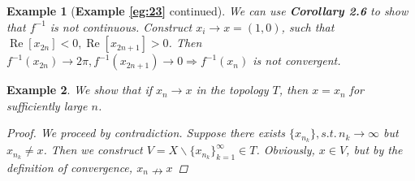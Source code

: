 \documentclass{article}
\newtheorem{example}{Example}[section] %
\begin{document}
\begin{example}[\textnormal{\textbf{Example \ref{eg:23}}} continued]
We can use \textnormal{\textbf{Corollary 2.6}} to show that $f^{-1}$ is not continuous. Construct $x_i \to x=(1,0)$, such that $\operatorname{Re}[x_{2n}]<0,\operatorname{Re}[x_{2n+1}]>0$. Then $f^{-1}(x_{2n})\to 2\pi,f^{-1}(x_{2n+1})\to 0\Rightarrow f^{-1}(x_n)$ is not convergent. 
\end{example}
\begin{example}
We show that if $x_n\to x$ in the topology $T$, then $x = x_n$ for sufficiently large $n$.
\begin{proof}
We proceed by contradiction. Suppose there exists $\{x_{n_k}\}, s.t.\, n_k\to \infty$ but $x_{n_k}\neq x$. Then we construct $V=X\backslash\{x_{n_k}\}_{k=1}^{\infty}\in T$. Obviously, $x\in V$, but by the definition of convergence, $x_n \nrightarrow x$
\end{proof}
\end{example}
\end{document}
